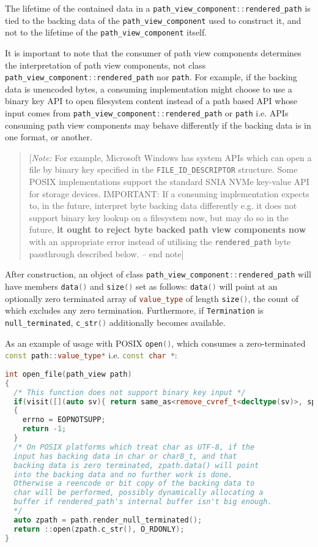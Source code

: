 \documentclass[11pt]{article}
\newcommand{\code}[2][cpp]{\lstinline[language=#1,basicstyle=\small\ttfamily]{#2}}
\newcommand{\note}[1]{\begin{quote}[\textit{Note:} #1 -- end note]\end{quote}}
\begin{document}
The lifetime of the contained data in a \code{path_view_component::rendered_path} is tied to the backing data of the \code{path_view_component} used to construct it, and not to the lifetime of the \code{path_view_component} itself.

It is important to note that the consumer of path view components determines the interpretation of path view components, not class \code{path_view_component::rendered_path} nor \code{path}. For example, if the backing data is unencoded bytes, a consuming implementation might choose to use a binary key API to open filesystem content instead of a path based API whose input comes from \code{path_view_component::rendered_path} or \code{path} i.e. APIs consuming path view components may behave differently if the backing data is in one format, or another.

\note{For example, Microsoft Windows has system APIs which can open a file by binary key specified in the \code{FILE_ID_DESCRIPTOR} structure. Some POSIX implementations support the standard SNIA NVMe key-value API for storage devices. IMPORTANT: If a consuming implementation expects to, in the future, interpret byte backing data differently e.g. it does not support binary key lookup on a filesystem now, but may do so in the future, \textbf{it ought to reject byte backed path view components now} with an appropriate error instead of utilising the \code{rendered_path} byte passthrough described below.}

After construction, an object of class \code{path_view_component::rendered_path} will have members \code{data()} and \code{size()} set as follows: \code{data()} will point at an optionally zero terminated array of \code{value_type} of length \code{size()}, the count of which excludes any zero termination. Furthermore, if \code{Termination} is \code{null_terminated}, \code{c_str()} additionally becomes available.

As an example of usage with POSIX \code{open()}, which consumes a zero-terminated \code{const path::value_type*} i.e. \code{const char *}:

\begin{lstlisting}[language=cpp]
int open_file(path_view path)
{
  /* This function does not support binary key input */
  if(visit([](auto sv){ return same_as<remove_cvref_t<decltype(sv)>, span<const byte>>; }, path))
  {
    errno = EOPNOTSUPP;
    return -1;
  }
  /* On POSIX platforms which treat char as UTF-8, if the
  input has backing data in char or char8_t, and that
  backing data is zero terminated, zpath.data() will point
  into the backing data and no further work is done.
  Otherwise a reencode or bit copy of the backing data to
  char will be performed, possibly dynamically allocating a
  buffer if rendered_path's internal buffer isn't big enough.
  */
  auto zpath = path.render_null_terminated();
  return ::open(zpath.c_str(), O_RDONLY);
}
\end{lstlisting}
\end{document}
